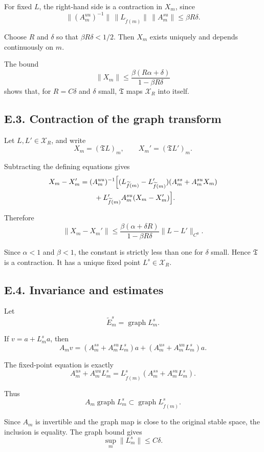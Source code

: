 \documentclass[12pt,a4paper]{article}
\theoremstyle{plain}
\numberwithin{equation}{section}
\numberwithin{theorem}{section}
\begin{document}
For fixed $L$, the right-hand side is a contraction in $X_m$, since
\[
\|(A_m^{uu})^{-1}\|\,
\|L_{\widetilde f(m)}\|\,
\|A_m^{su}\|
\le
\beta R\delta.
\]

Choose $R$ and $\delta$ so that $\beta R\delta<1/2$. Then $X_m$ exists uniquely and depends continuously on $m$.

The bound
\[
\|X_m\|
\le
\frac{\beta(R\alpha+
\delta)}{1-
\beta R\delta}
\]
shows that, for $R=C\delta$ and $\delta$ small, $\mathfrak T$ maps $\mathcal X_R$ into itself.

\subsection{E.3. Contraction of the graph transform}

Let $L,L'\in\mathcal X_R$, and write
\[
X_m=(\mathfrak T L)_m,
\qquad
X_m'=(\mathfrak T L')_m.
\]

Subtracting the defining equations gives
\[
\begin{aligned}
X_m-X_m'
&=(A_m^{uu})^{-1}
\Bigl[
(L_{\widetilde f(m)}-L'_{\widetilde f(m)})(A_m^{ss}+A_m^{su}X_m)\\
&\qquad
+L'_{\widetilde f(m)}A_m^{su}(X_m-X_m')
\Bigr].
\end{aligned}
\]

Therefore
\[
\|X_m-X_m'\|
\le
\frac{\beta(\alpha+\delta R)}{1-\beta R\delta}
\|L-L'\|_{C^0}.
\]

Since $\alpha<1$ and $\beta<1$, the constant is strictly less than one for $\delta$ small. Hence $\mathfrak T$ is a contraction. It has a unique fixed point $L^s\in\mathcal X_R$.

\subsection{E.4. Invariance and estimates}

Let
\[
\widetilde E_m^s=
\operatorname{graph}L_m^s.
\]

If $v=a+L_m^s a$, then
\[
A_m v
=
(A_m^{ss}+A_m^{su}L_m^s)a
+
(A_m^{us}+A_m^{uu}L_m^s)a.
\]

The fixed-point equation is exactly
\[
A_m^{us}+A_m^{uu}L_m^s
=
L_{\widetilde f(m)}^s(A_m^{ss}+A_m^{su}L_m^s).
\]

Thus
\[
A_m\operatorname{graph}L_m^s
\subset
\operatorname{graph}L_{\widetilde f(m)}^s.
\]

Since $A_m$ is invertible and the graph map is close to the original stable space, the inclusion is equality. The graph bound gives
\[
\sup_m\|L_m^s\|\le C\delta.
\]
\end{document}
